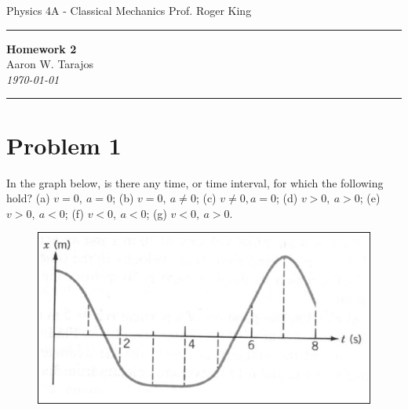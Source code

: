 \documentclass{article}
\begin{document}
\noindent
Physics 4A - Classical Mechanics \hfill Prof. Roger King

\noindent\rule{\textwidth}{0.4pt}

\begin{center}
    \textbf{\LARGE Homework 2} \\
    \vspace{12pt}
    \large Aaron W. Tarajos \\
    \textit{\today}
\end{center}

\noindent\rule{\textwidth}{0.4pt}

\section*{Problem 1}
In the graph below, is there any time, or time interval, for which the following hold? (a)
$v = 0,\ a = 0$; (b) $v = 0,\ a \ne 0$; (c) $v \ne 0, a = 0$; (d) $v > 0,\ a > 0$; (e) $v > 0,\ a < 0$;
(f) $v < 0,\ a < 0$; (g) $v < 0,\ a > 0$.

\begin{figure}[ht]
    \centering
    \includegraphics[scale=0.5]{graph-1.png}
\end{figure}
\end{document}
